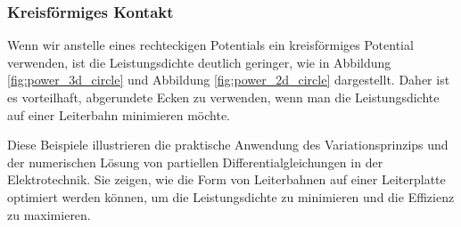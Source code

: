 \subsubsection{Kreisförmiges Kontakt} Wenn wir anstelle eines rechteckigen Potentials ein kreisförmiges Potential verwenden, ist die Leistungsdichte deutlich geringer, wie in Abbildung \ref{fig:power_3d_circle} und Abbildung \ref{fig:power_2d_circle} dargestellt. Daher ist es vorteilhaft, abgerundete Ecken zu verwenden, wenn man die Leistungsdichte auf einer Leiterbahn minimieren möchte.

Diese Beispiele illustrieren die praktische Anwendung des Variationsprinzips und der numerischen Lösung von partiellen Differentialgleichungen in der Elektrotechnik. Sie zeigen, wie die Form von Leiterbahnen auf einer Leiterplatte optimiert werden können, um die Leistungsdichte zu minimieren und die Effizienz zu maximieren.